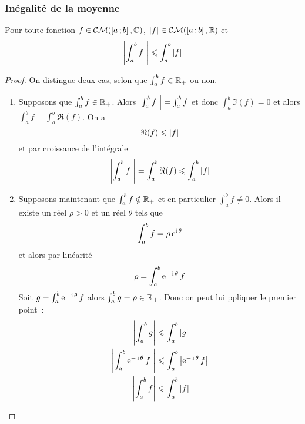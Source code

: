 \subsubsection{Inégalité de la moyenne}

\begin{theo}
  Pour toute fonction \(f \in \mathcal{CM}(\left[ a \, ; {} b \right],\mathbb{C})\), \(\left\lvert f\right\rvert \in 
  \mathcal{CM}(\left[ a \, ; {} b \right],\mathbb{R})\) et
  \begin{equation}
    \left\lvert\int_a^b f~\right\rvert \leqslant \int_a^b \left\lvert f\right\rvert
  \end{equation}
\end{theo}
\begin{proof}
  On distingue deux cas, selon que \(\int_a^b f \in \mathbb{R}_{+}\) ou non.
  \begin{enumerate}
    \item Supposons que \(\int_a^b f \in \mathbb{R}_{+}\). Alors \(\left\lvert\int_a^b 
      f~\right\rvert=\int_a^b f\) et donc \(\int_a^b \Im(f) =0\) et alors \(\int_a^b f = 
      \int_a^b \Re(f)\). On a
      \begin{equation}
        \Re(f) \leqslant \left\lvert f\right\rvert
      \end{equation}
      et par croissance de l'intégrale
      \begin{equation}
        \left\lvert\int_a^b f~\right\rvert = \int_a^b \Re(f) \leqslant \int_a^b \left\lvert f\right\rvert
      \end{equation}
    \item Supposons maintenant que \(\int_a^b f \notin \mathbb{R}_{+}\) et en 
      particulier \(\int_a^b f \neq 0\). Alors il existe un réel \(\rho >0\) 
      et un réel \(\theta\) tels que
      \begin{equation}
        \int_a^b f = \rho \operatorname{e}^{\operatorname{i} \theta}
      \end{equation}
      et alors par linéarité
      \begin{equation}
        \rho = \int_a^b \operatorname{e}^{-\operatorname{i} \theta}f
      \end{equation}
      Soit \(g=\int_a^b \operatorname{e}^{-\operatorname{i} \theta}f\) alors \(\int_a^b g=\rho \in 
      \mathbb{R}_{+}\). Donc on peut lui ppliquer le premier point~:
      \begin{align*}
        \left\lvert\int_a^b g\right\rvert &\leqslant \int_a^b \left\lvert g\right\rvert \\
        \left\lvert\int_a^b \operatorname{e}^{-\operatorname{i} \theta} f~\right\rvert &\leqslant \int_a^b \left\lvert\operatorname{e}^{-\operatorname{i} 
        \theta} f\right\rvert \\
        \left\lvert\int_a^b f\right\rvert &\leqslant \int_a^b \left\lvert f\right\rvert \\
      \end{align*}
  \end{enumerate}
\end{proof}

